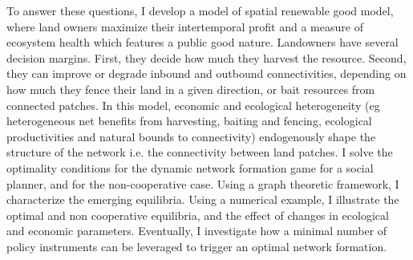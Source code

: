 \documentclass{article}
\begin{document}
To answer these questions, I develop a model of spatial renewable good model, where land owners maximize their intertemporal profit and a measure of ecosystem health which features a public good nature. Landowners have several decision margins. First, they decide how much they harvest the resource. Second, they can improve or degrade inbound and outbound connectivities, depending on how much they fence their land in a given direction, or bait resources from connected patches. In this model, economic and ecological heterogeneity (eg heterogeneous net benefits from harvesting, baiting and fencing, ecological productivities and natural bounds to connectivity) endogenously shape the structure of the network i.e. the connectivity between land patches. I solve the optimality conditions for the dynamic network formation game for a social planner, and for the non-cooperative case. Using a graph theoretic framework, I characterize the emerging equilibria. Using a numerical example, I illustrate the optimal and non cooperative equilibria, and the effect of changes in ecological and economic parameters. Eventually, I investigate how a minimal number of policy instruments can be leveraged to trigger an optimal network formation.
\end{document}
